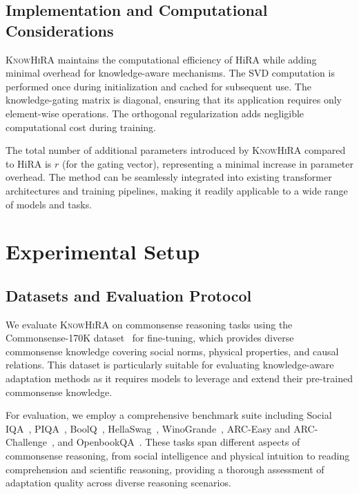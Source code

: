 \documentclass[10pt,letterpaper]{article}
\begin{document}
\subsection{Implementation and Computational Considerations}

\textsc{KnowHiRA} maintains the computational efficiency of HiRA while adding minimal overhead for knowledge-aware mechanisms. The SVD computation is performed once during initialization and cached for subsequent use. The knowledge-gating matrix is diagonal, ensuring that its application requires only element-wise operations. The orthogonal regularization adds negligible computational cost during training.

The total number of additional parameters introduced by \textsc{KnowHiRA} compared to HiRA is $r$ (for the gating vector), representing a minimal increase in parameter overhead. The method can be seamlessly integrated into existing transformer architectures and training pipelines, making it readily applicable to a wide range of models and tasks.

\section{Experimental Setup}

\subsection{Datasets and Evaluation Protocol}

We evaluate \textsc{KnowHiRA} on commonsense reasoning tasks using the Commonsense-170K dataset~\citep{commonsense170k} for fine-tuning, which provides diverse commonsense knowledge covering social norms, physical properties, and causal relations. This dataset is particularly suitable for evaluating knowledge-aware adaptation methods as it requires models to leverage and extend their pre-trained commonsense knowledge.

For evaluation, we employ a comprehensive benchmark suite including Social IQA~\citep{sap2019social}, PIQA~\citep{bisk2020piqa}, BoolQ~\citep{clark2019boolq}, HellaSwag~\citep{zellers2019hellaswag}, WinoGrande~\citep{sakaguchi2021winogrande}, ARC-Easy and ARC-Challenge~\citep{clark2018think}, and OpenbookQA~\citep{mihaylov2018can}. These tasks span different aspects of commonsense reasoning, from social intelligence and physical intuition to reading comprehension and scientific reasoning, providing a thorough assessment of adaptation quality across diverse reasoning scenarios.
\end{document}
